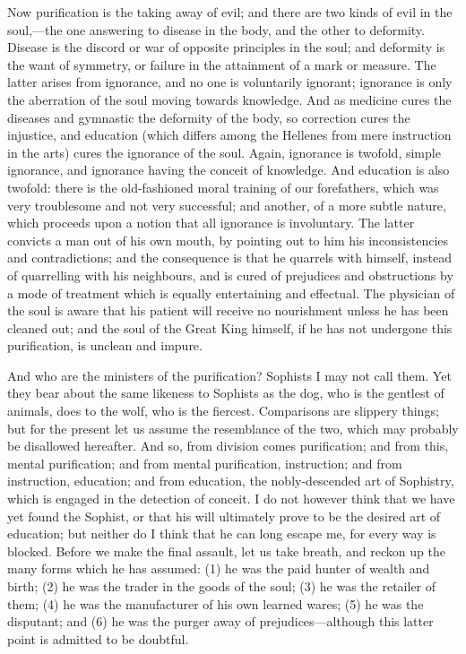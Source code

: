 \documentclass[11pt,letter]{article}
\begin{document}
\par  Now purification is the taking away of evil; and there are two kinds of evil in the soul,—the one answering to disease in the body, and the other to deformity. Disease is the discord or war of opposite principles in the soul; and deformity is the want of symmetry, or failure in the attainment of a mark or measure. The latter arises from ignorance, and no one is voluntarily ignorant; ignorance is only the aberration of the soul moving towards knowledge. And as medicine cures the diseases and gymnastic the deformity of the body, so correction cures the injustice, and education (which differs among the Hellenes from mere instruction in the arts) cures the ignorance of the soul. Again, ignorance is twofold, simple ignorance, and ignorance having the conceit of knowledge. And education is also twofold: there is the old-fashioned moral training of our forefathers, which was very troublesome and not very successful; and another, of a more subtle nature, which proceeds upon a notion that all ignorance is involuntary. The latter convicts a man out of his own mouth, by pointing out to him his inconsistencies and contradictions; and the consequence is that he quarrels with himself, instead of quarrelling with his neighbours, and is cured of prejudices and obstructions by a mode of treatment which is equally entertaining and effectual. The physician of the soul is aware that his patient will receive no nourishment unless he has been cleaned out; and the soul of the Great King himself, if he has not undergone this purification, is unclean and impure.

\par  And who are the ministers of the purification? Sophists I may not call them. Yet they bear about the same likeness to Sophists as the dog, who is the gentlest of animals, does to the wolf, who is the fiercest. Comparisons are slippery things; but for the present let us assume the resemblance of the two, which may probably be disallowed hereafter. And so, from division comes purification; and from this, mental purification; and from mental purification, instruction; and from instruction, education; and from education, the nobly-descended art of Sophistry, which is engaged in the detection of conceit. I do not however think that we have yet found the Sophist, or that his will ultimately prove to be the desired art of education; but neither do I think that he can long escape me, for every way is blocked. Before we make the final assault, let us take breath, and reckon up the many forms which he has assumed: (1) he was the paid hunter of wealth and birth; (2) he was the trader in the goods of the soul; (3) he was the retailer of them; (4) he was the manufacturer of his own learned wares; (5) he was the disputant; and (6) he was the purger away of prejudices—although this latter point is admitted to be doubtful.
\end{document}
